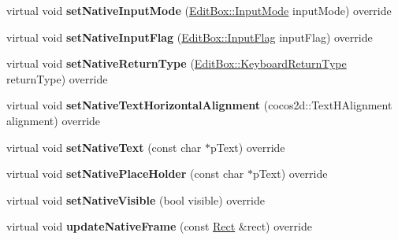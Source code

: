 \begin{DoxyCompactItemize}
\item 
\mbox{\label{classui_1_1EditBoxImplMac_a0e9f5a7f752004d83cb3c2aa29540b53}} 
virtual void {\bfseries set\+Native\+Input\+Mode} (\hyperlink{classui_1_1EditBox_a7a1bfe8f3ba218bedfcf5451ec3ce01a}{Edit\+Box\+::\+Input\+Mode} input\+Mode) override
\item 
\mbox{\label{classui_1_1EditBoxImplMac_ab20634846eff07112c4ba56112236b27}} 
virtual void {\bfseries set\+Native\+Input\+Flag} (\hyperlink{classui_1_1EditBox_af02f13ee9fba51d59bb3111e200848c8}{Edit\+Box\+::\+Input\+Flag} input\+Flag) override
\item 
\mbox{\label{classui_1_1EditBoxImplMac_a47cf9d34d261cb5f2af6f09ee015bb0b}} 
virtual void {\bfseries set\+Native\+Return\+Type} (\hyperlink{classui_1_1EditBox_a1e1285b6f742975b26bdeb8108ca6e51}{Edit\+Box\+::\+Keyboard\+Return\+Type} return\+Type) override
\item 
\mbox{\label{classui_1_1EditBoxImplMac_a345eb47ee8007436307dd292608f30bd}} 
virtual void {\bfseries set\+Native\+Text\+Horizontal\+Alignment} (cocos2d\+::\+Text\+H\+Alignment alignment) override
\item 
\mbox{\label{classui_1_1EditBoxImplMac_af211de321e15e135ba729155a32c83db}} 
virtual void {\bfseries set\+Native\+Text} (const char $\ast$p\+Text) override
\item 
\mbox{\label{classui_1_1EditBoxImplMac_a0361f07312f5da63f257a4cde7e73b07}} 
virtual void {\bfseries set\+Native\+Place\+Holder} (const char $\ast$p\+Text) override
\item 
\mbox{\label{classui_1_1EditBoxImplMac_ae34805f7c8d6174f88d51fc7ef78cbce}} 
virtual void {\bfseries set\+Native\+Visible} (bool visible) override
\item 
\mbox{\label{classui_1_1EditBoxImplMac_afc9951ef4d94c3c7531f26162c886231}} 
virtual void {\bfseries update\+Native\+Frame} (const \hyperlink{classRect}{Rect} \&rect) override
\item 
\mbox{\label{classui_1_1EditBoxImplMac_a2d7c5e6e1eb4743df73a175dfbece14f}} 

\end{DoxyCompactItemize}
